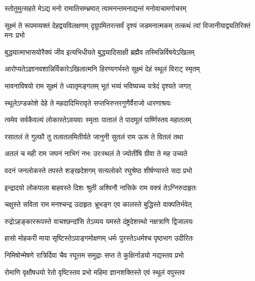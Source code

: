


\addtocounter{shlokacount}{29}

\twolineshloka
{स्तोतुमुत्सहते मेऽद्य मनो रामातिसम्भ्रमात्}
{त्वामनन्तमनाद्यन्तं मनोवाचामगोचरम्} %

\threelineshloka
{सूक्ष्मं ते रूपमव्यक्तं देहद्वयविलक्षणम्}
{दृग्रूपमितरत्सर्वं दृश्यं जडमनात्मकम्}
{तत्कथं त्वां विजानीयाद्व्यतिरिक्तं मनः प्रभो} %

\twolineshloka
{बुद्ध्यात्माभासयोरैक्यं जीव इत्यभिधीयते}
{बुद्ध्यादिसाक्षी ब्रह्मैव तस्मिन्निर्विषयेऽखिलम्} %

\twolineshloka
{आरोप्यतेऽज्ञानवशान्निर्विकारेऽखिलात्मनि}
{हिरण्यगर्भस्ते सूक्ष्मं देहं स्थूलं विराट् स्मृतम्} %

\twolineshloka
{भावनाविषयो राम सूक्ष्मं ते ध्यातृमङ्गलम्}
{भूतं भव्यं भविष्यच्च यत्रेदं दृश्यते जगत्} %

\twolineshloka
{स्थूलेऽण्डकोशे देहे ते महदादिभिरावृते}
{सप्तभिरुत्तरगुणैर्वैराजो धारणाश्रयः} %

\twolineshloka
{त्वमेव सर्वकैवल्यं लोकास्तेऽवयवाः स्मृताः}
{पातालं ते पादमूलं पार्ष्णिस्तव महातलम्} %

\twolineshloka
{रसातलं ते गुल्फौ तु तलातलमितीर्यते}
{जानुनी सुतलं राम ऊरू ते वितलं तथा} %

\twolineshloka
{अतलं च मही राम जघनं नाभिगं नभः}
{उरःस्थलं ते ज्योतींषि ग्रीवा ते मह उच्यते} %

\twolineshloka
{वदनं जनलोकस्ते तपस्ते शङ्खदेशगम्}
{सत्यलोको रघुश्रेष्ठ शीर्षण्यास्ते सदा प्रभो} %

\twolineshloka
{इन्द्रादयो लोकपाला बाहवस्ते दिशः श्रुती}
{अश्विनौ नासिके राम वक्त्रं तेऽग्निरुदाहृतः} %

\twolineshloka
{चक्षुस्ते सविता राम मनश्चन्द्र उदाहृतः}
{भ्रूभङ्ग एव कालस्ते बुद्धिस्ते वाक्पतिर्भवेत्} %

\twolineshloka
{रुद्रोऽहङ्काररूपस्ते वाचश्छन्दांसि तेऽव्यय}
{यमस्ते दंष्ट्रदेशस्थो नक्षत्राणि द्विजालयः} %

\twolineshloka
{हासो मोहकरी माया सृष्टिस्तेऽपाङ्गमोक्षणम्}
{धर्मः पुरस्तेऽधर्मश्च पृष्ठभाग उदीरितः} %

\twolineshloka
{निमिषोन्मेषणे रात्रिर्दिवा चैव रघूत्तम}
{समुद्राः सप्त ते कुक्षिर्नाड्यो नद्यस्तव प्रभो} %

\twolineshloka
{रोमाणि वृक्षौषधयो रेतो वृष्टिस्तव प्रभो}
{महिमा ज्ञानशक्तिस्ते एवं स्थूलं वपुस्तव} %

